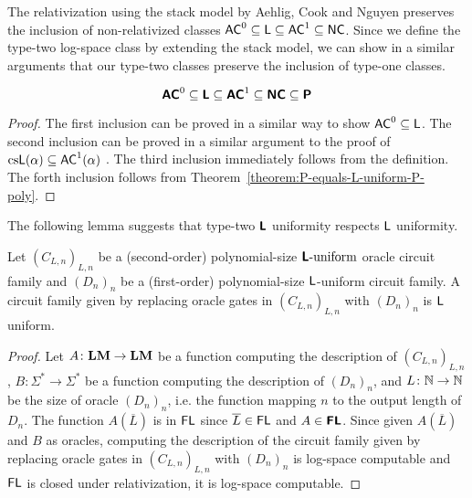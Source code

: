 \documentclass[envcountsame,orivec,oribibl]{llncs}
\begin{document}
The relativization using the stack model by Aehlig, Cook and Nguyen preserves
the inclusion of non-relativized classes
$\mathsf{AC}^0 \subseteq \mathsf{L} \subseteq \mathsf{AC}^1 \subseteq \mathsf{NC}$.
Since we define the type-two log-space class by extending the stack model,
we can show in a similar arguments 
that our type-two classes preserve the inclusion of type-one classes.

\begin{theorem}
\label{theorem:inclusion}
\begin{equation}
 \text{\bfseries \sffamily \upshape AC}^0
 \subseteq \text{\bfseries \sffamily \upshape L} 
 \subseteq \text{\bfseries \sffamily \upshape AC}^1
 \subseteq \text{\bfseries \sffamily \upshape NC}
 \subseteq \text{\bfseries \sffamily \upshape P}
\end{equation}
\end{theorem}

\begin{proof}
 The first inclusion can be proved in a similar way
 to show $\mathsf{AC}^0 \subseteq \mathsf{L}$.
 The second inclusion can be proved in a similar argument to 
 the proof of $\text{cs}\mathsf{L}(\alpha) \subseteq \mathsf{AC}^1(\alpha)$
 \cite{aehlig2007relativizing}.
 The third inclusion immediately follows from the definition.
 The forth inclusion follows from Theorem~\ref{theorem:P-equals-L-uniform-P-poly}.
\end{proof}


The following lemma suggests that type-two $\text{\bfseries \sffamily \upshape L}$ uniformity respects
$\mathsf{L}$ uniformity.
\begin{lemma}
 Let $(C_{L,n})_{L,n}$ be a (second-order) polynomial-size $\text{\bfseries \sffamily \upshape L}\text{-uniform}$ oracle circuit family
 and $(D_n)_n$ be a (first-order) polynomial-size $\mathsf{L}$-uniform circuit family.
 A circuit family given by replacing oracle gates in $(C_{L,n})_{L,n}$ with
 $(D_n)_n$ is $\mathsf{L}$ uniform.
\end{lemma}

\begin{proof}
 Let $A \colon \mathbf{LM} \to \mathbf{LM}$ be a function computing the description of $(C_{L,n})_{L,n}$,
 $B \colon \Sigma^* \to \Sigma^*$ be a function computing the description of $(D_n)_n$, and
 $L \colon \mathbb N \to \mathbb N$ be the size of oracle $(D_n)_n$, i.e.
 the function mapping $n$ to the output length of $D_n$.
 The function $A(\overline{L})$ is in $\mathsf{FL}$ since $\overline{L} \in \mathsf{FL}$ and $A \in \text{\bfseries \sffamily \upshape FL}$.
 Since given $A(\overline{L})$ and $B$ as oracles,
 computing the description of the circuit family given by replacing oracle
 gates in $(C_{L,n})_{L,n}$ with $(D_n)_n$ is log-space computable
 and $\mathsf{FL}$ is closed under relativization,
 it is log-space computable.
\end{proof}
\end{document}
